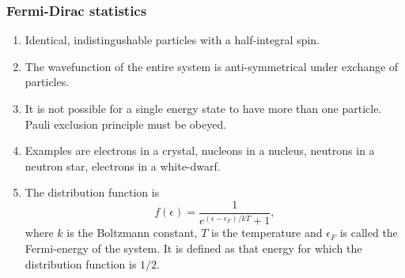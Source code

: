 \documentclass{beamer}
\begin{document}
\begin{frame}
\frametitle{Fermi-Dirac statistics}
\begin{enumerate}
\item Identical, indistingushable particles with a half-integral spin.
\item The wavefunction of the entire system is anti-symmetrical under exchange
of particles.
\item It is not possible for a single energy state to have more than one 
particle. Pauli exclusion principle must be obeyed.
\item Examples are electrons in a crystal, nucleons in a nucleus, neutrons in
a neutron star, electrons in a white-dwarf.
\item The distribution function is
\begin{equation}\label{e6}
f(\epsilon) = \frac{1}{e^{(\epsilon - \epsilon_F)/kT} + 1},
\end{equation}
where $k$ is the Boltzmann constant, $T$ is the temperature and $\epsilon_F$
is called the Fermi-energy of the system. It is defined as that energy for which
the distribution function is $1/2$.
\end{enumerate}
\end{frame}
\end{document}
